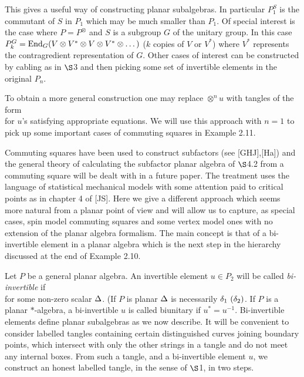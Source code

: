 \bs
This gives a useful way of constructing planar subalgebras. In
particular $P^S_1$ is the commutant of $S$ in $P_1$ which may be
much smaller than $P_1$. Of special interest is the case where
$P=P^{\otimes}$ and $S$ is a subgroup $G$ of the unitary group.
In this case $P^G_k={\bf\rm{End}}_G(V\otimes V^*\otimes V\otimes
V^*\otimes \dots)$ ($k$ copies of $V$ or $V^*$) where $V^*$
represents the contragredient representation of $G$. Other cases of
interest can be constructed by cabling as in $\S$3 and then picking
some set of invertible elements in the original  $P_n$.

To obtain a more general construction one may replace
$\otimes^nu$ with tangles of the form
\[
        
\]
\ni for $u$'s satisfying appropriate equations. We will use this
approach with $n=1$ to pick up some important cases of commuting
squares in Example 2.11.



\newpage
{}

Commuting squares have been used to construct subfactors (see
[GHJ],[Ha]) and the general theory of calculating the
subfactor planar algebra of $\S$4.2 from a commuting square will be
dealt with in a future paper. The treatment uses the language of
statistical mechanical models with some attention paid to critical
points as in chapter 4 of [JS]. Here we give a different
approach which seems more natural from a planar point of view and
will allow us to capture, as special cases, spin model commuting
squares and some vertex model ones with no extension of the planar
algebra formalism. The main concept is that of a bi-invertible
element in a planar algebra which is the next step in the
hierarchy discussed at the end of Example 2.10.

 Let $P$ be a general planar algebra. An
invertible element $u\in P_2$ will be called {\it bi-invertible} if
\[
        
\]
\ni for some non-zero scalar $\Delta$. (If $P$ is planar $\Delta$ is
necessarily $\delta_1 \ (\delta_2)$. If $P$ is a planar $*$-algebra, a
 bi-invertible $u$ is called biunitary  if $u^*=u^{-1}$.
Bi-invertible elements define planar subalgebras as we now
describe. It will be convenient to consider labelled tangles
containing certain distinguished curves joining boundary points,
which intersect with only the other strings in a tangle and do not
meet any internal boxes. From such a tangle, and a
bi-invertible element $u$, we construct an honest labelled tangle,
in the sense of $\S$1, in two steps.


